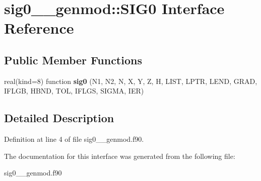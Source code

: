 \hypertarget{interfacesig0____genmod_1_1_s_i_g0}{\section{sig0\+\_\+\+\_\+genmod\+:\+:S\+I\+G0 Interface Reference}
\label{interfacesig0____genmod_1_1_s_i_g0}
}
\subsection*{Public Member Functions}
\begin{DoxyCompactItemize}
\item 
\hypertarget{interfacesig0____genmod_1_1_s_i_g0_aeb623569e5eecc4137ae586621ec9097}{real(kind=8) function {\bfseries sig0} (N1, N2, N, X, Y, Z, H, L\+I\+S\+T, L\+P\+T\+R, L\+E\+N\+D, G\+R\+A\+D, I\+F\+L\+G\+B, H\+B\+N\+D, T\+O\+L, I\+F\+L\+G\+S, S\+I\+G\+M\+A, I\+E\+R)}\label{interfacesig0____genmod_1_1_s_i_g0_aeb623569e5eecc4137ae586621ec9097}

\end{DoxyCompactItemize}


\subsection{Detailed Description}


Definition at line 4 of file sig0\+\_\+\+\_\+genmod.\+f90.



The documentation for this interface was generated from the following file\+:\begin{DoxyCompactItemize}
\item 
sig0\+\_\+\+\_\+genmod.\+f90\end{DoxyCompactItemize}
